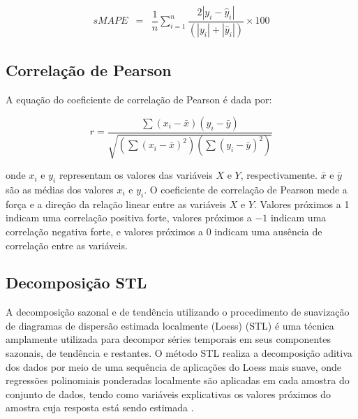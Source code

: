 \begin{eqnarray}
	sMAPE &=& \dfrac{1}{n} \sum_{i=1}^{n} \dfrac{2|y_i - \hat{y}_i|}{(|y_i| + |\hat{y}_i|)} \times 100\label{eq:smape}
\end{eqnarray}







\subsection{Correla\c c\~ao de Pearson}

%
%
%
A equação do coeficiente de correlação de Pearson é dada por:

\begin{equation}
	r=\frac{\sum\left(x_i-\bar{x}\right)\left(y_i-\bar{y}\right)}{\sqrt{\left(\sum\left(x_i-\bar{x}\right)^2\right)\left(\sum\left(y_i-\bar{y}\right)^2\right)}}
\end{equation}

\noindent onde $x_i$ e $y_i$ representam os valores das variáveis $X$ e $Y$, respectivamente. $\bar{x}$ e $\bar{y}$ são as médias dos valores $x_i$ e $y_i$. O coeficiente de correlação de Pearson mede a força e a direção da relação linear entre as variáveis $X$ e $Y$. Valores próximos a 1 indicam uma correlação positiva forte, valores próximos a $-1$ indicam uma correlação negativa forte, e valores próximos a $0$ indicam uma ausência de correlação entre as variáveis.


\subsection{Decomposi\c c\~ao STL}

A decomposição sazonal e de tendência utilizando o procedimento de suavização de diagramas de dispersão estimada localmente (Loess) (STL) é uma técnica amplamente utilizada para decompor séries temporais em seus componentes sazonais, de tendência e restantes. O método STL realiza a decomposição aditiva dos dados por meio de uma sequência de aplicações do Loess mais suave, onde regressões polinomiais ponderadas localmente são aplicadas em cada amostra do conjunto de dados, tendo como variáveis explicativas os valores próximos do amostra cuja resposta está sendo estimada \cite{Theodosiou20111178}.

